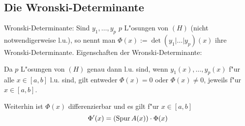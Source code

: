\subsection{Die Wronski-Determinante}
 Wronski-Determinante:{
  Sind $y_1,\ldots,y_p$ $p$ L"osungen von $(H)$ (nicht notwendigerweise
  l.u.), so nennt man $\Phi(x):=\det(y_1|\ldots|y_p)(x)$ ihre 
  Wronski-Determinante.
  }
\remark Eigenschaften der Wronski-Determinante:{
  Da $p$ L"osungen von $(H)$ genau dann l.u. sind, wenn $y_1(x),\ldots,y_p(x)$
  f"ur alle $x\in[a,b]$ l.u. sind, gilt entweder $\Phi(x)=0$ oder 
  $\Phi(x)\neq 0$, jeweils f"ur $x\in[a,b]$.
  
  Weiterhin ist $\Phi(x)$ differenzierbar und es gilt f"ur $x\in[a,b]$
  \[\Phi'(x)=(\operatorname{Spur} A(x))\cdot \Phi(x)
    \]
  }
